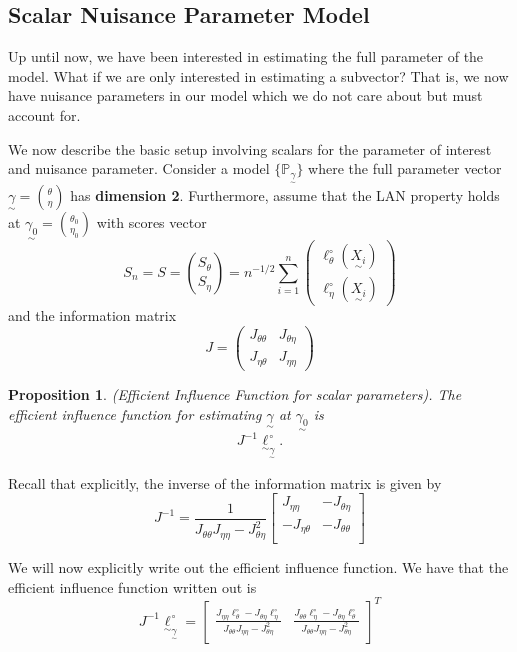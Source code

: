 \documentclass[twoside]{article}
\newtheorem{proposition}[theorem]{Proposition}
\newcommand{\prob}{\mathbb{P}}
\newcommand{\utilde}{\underset{\sim}}
\begin{document}
\subsection{Scalar Nuisance Parameter Model}
Up until now, we have been interested in estimating the full parameter of the model. What if we are only interested in estimating a subvector? That is, we now have nuisance parameters in our model which we do not care about but must account for.

We now describe the basic setup involving scalars for the parameter of interest and nuisance parameter. Consider a model $\{\prob_{\utilde{\gamma}}\}$ where the full parameter vector $\utilde{\gamma} = {\theta \choose \eta}$ has \textbf{dimension 2}. Furthermore, assume that the LAN property holds at $\utilde{\gamma_{0}} = {\theta_0 \choose \eta_0}$ with scores vector
$$
S_n = S = {S_{\theta} \choose S_{\eta}} = n^{-1/2}\sum_{i=1}^{n}
\begin{pmatrix}
\ell_{\theta}^{\circ}(\utilde{X_i})\\
\ell_{\eta}^{\circ}(\utilde{X_i})
\end{pmatrix}
$$
and the information matrix 
$$
J = \begin{pmatrix}
J_{\theta \theta} & J_{\theta \eta}\\
J_{\eta \theta} & J_{\eta \eta}
\end{pmatrix}
$$

\begin{proposition}(Efficient Influence Function for scalar parameters).
The efficient influence function for estimating $\utilde{\gamma}$ at $\utilde{\gamma_0}$ is $$J^{-1}\utilde{\ell}_{\utilde{\gamma}}^{\circ}.$$
\end{proposition}

Recall that explicitly, the inverse of the information matrix is given by
$$
J^{-1} = \frac{1}{J_{\theta \theta}J_{\eta \eta} - J_{\theta \eta}^2}
\begin{bmatrix}
J_{\eta \eta} & - J_{\theta \eta}\\
-J_{\eta \theta} & - J_{\theta \theta}\\
\end{bmatrix}
$$

We will now explicitly write out the efficient influence function. We have that the efficient influence function written out is 
$$
J^{-1}\utilde{\ell}_{\utilde{\gamma}}^{\circ} = 
\begin{bmatrix}
\frac{J_{\eta \eta}\ell_{\theta}^{\circ} - J_{\theta \eta}\ell_{\eta}^{\circ}}{J_{\theta \theta}J_{\eta \eta} - J_{\theta \eta}^2} &
\frac{J_{\theta \theta}\ell_{\eta}^{\circ} - J_{\theta \eta}\ell_{\theta}^{\circ}}{J_{\theta \theta}J_{\eta \eta} - J_{\theta \eta}^2}
\end{bmatrix}^T
$$
\end{document}
